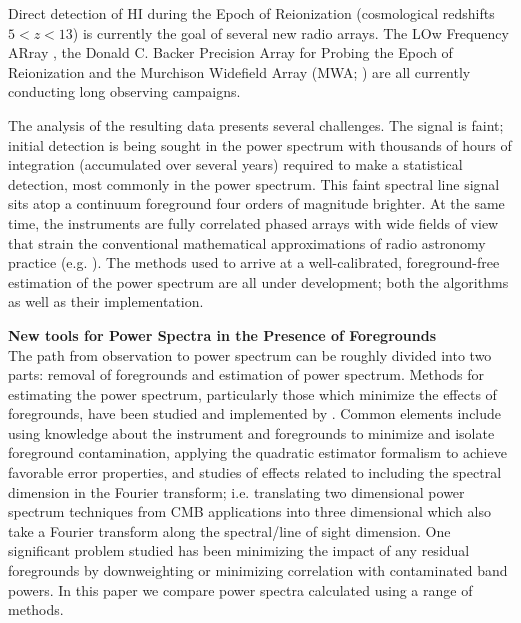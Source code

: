 \documentclass[twolcolumn,iop]{emulateapj}
\begin{document}
Direct detection of HI during the Epoch of Reionization (cosmological redshifts $5<z<13$) is currently the goal of several new radio arrays. The LOw Frequency ARray \citep[LOFAR;][]{Yatawatta:2013p9699}, the Donald C. Backer Precision Array for Probing the Epoch of Reionization \citep[PAPER;][]{Parsons:2014p10499} and the Murchison Widefield Array (MWA; \cite{Tingay:2013p9022,Bowman:2013p9950}) are all currently conducting long observing campaigns.



The analysis of the resulting data presents several challenges. The signal is faint; initial detection is being sought in the power spectrum with thousands of hours of integration (accumulated over several years) required to make a statistical detection, most commonly in the power spectrum. This faint spectral line signal sits atop a continuum foreground four orders of magnitude brighter\cite{Santos:2006p6697,Bowman:2009p7816,Pober:2013p9942}. At the same time, the instruments are fully correlated phased arrays with wide fields of view that strain the conventional mathematical approximations of radio astronomy practice (e.g. \cite{2007TMS}). The methods used to arrive at a well-calibrated, foreground-free estimation of the power spectrum are all under development; both the algorithms as well as their implementation.  



{\bf New tools for Power Spectra in the Presence of Foregrounds}\\
The path from observation to power spectrum can be roughly divided into two parts: removal of foregrounds and estimation of power spectrum. 
Methods for estimating the power spectrum, particularly those which minimize the effects of foregrounds, have been studied and implemented by \citet{Morales:2006p1870,Jelic:2008p2130,Harker:2009MNRAS.397.1138H,Morales:2012p8790,Liu:2011p8763,Trott:2012p10466,Chapman:7p8505,Chapman:2013p10379,Dillon:2013p10497,Dillon:2014p9788,2014PhRvD..90b3018L,2014PhRvD..90b3019L}. Common elements include using knowledge about the instrument and foregrounds to minimize and isolate foreground contamination, applying the  quadratic estimator formalism to achieve favorable error properties, and studies of effects related to including the spectral dimension in the Fourier transform; i.e. translating two dimensional power spectrum techniques from CMB applications into three dimensional which also take a Fourier transform along the spectral/line of sight dimension.   One significant problem studied has been minimizing the impact of any residual foregrounds by downweighting or minimizing correlation with contaminated band powers. In this paper we compare power spectra calculated using a range of methods. 
\end{document}

